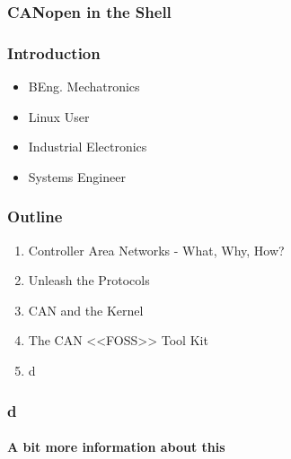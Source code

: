 \documentclass{beamer}
\begin{document}
  \begin{frame}
    \frametitle{CANopen in the Shell}
  \end{frame}
  
  \begin{frame}
    \frametitle{Introduction}
    \begin{itemize}
      \item{BEng. Mechatronics}
      \item{Linux User}
      \item{Industrial Electronics}
      \item{Systems Engineer}
    \end{itemize}
    \end{frame}
  
  \begin{frame}
    \frametitle{Outline}
    \begin{enumerate}
      \item{Controller Area Networks - What, Why, How?}
      \item{Unleash the Protocols}
      \item{CAN and the Kernel}
      \item{The CAN <<FOSS>> Tool Kit}
      \item{d}
   \end{enumerate}        
    
  \end{frame}

\begin{frame}
    \frametitle{d}
    \framesubtitle{A bit more information about this}
  \end{frame}
  
\end{document}
